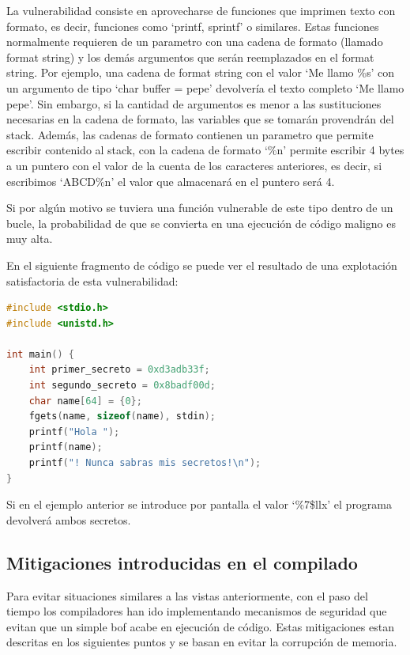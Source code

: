 La vulnerabilidad consiste en aprovecharse de funciones que imprimen texto con formato, es decir, funciones como `printf, sprintf' o similares.
Estas funciones normalmente requieren de un parametro con una cadena de formato (llamado format string) y los demás argumentos que serán reemplazados en el format string.
Por ejemplo, una cadena de format string con el valor `Me llamo \%s' con un argumento de tipo `char \*buffer = pepe' devolvería el texto completo `Me llamo pepe'.
Sin embargo, si la cantidad de argumentos es menor a las sustituciones necesarias en la cadena de formato, las variables que se tomarán provendrán del stack.
Además, las cadenas de formato contienen un parametro que permite escribir contenido al stack, con la cadena de formato `\%n' permite escribir 4 bytes a un puntero con el valor de la cuenta de los caracteres anteriores, es decir, si escribimos `ABCD\%n' el valor que almacenará en el puntero será 4.

Si por algún motivo se tuviera una función vulnerable de este tipo dentro de un bucle, la probabilidad de que se convierta en una ejecución de código maligno es muy alta.

En el siguiente fragmento de código se puede ver el resultado de una explotación satisfactoria de esta vulnerabilidad:
\pagebreak
\begin{lstlisting}[language=C, caption=Vulnerabilidad de tipo Format String]
#include <stdio.h>
#include <unistd.h>

int main() {
    int primer_secreto = 0xd3adb33f;
    int segundo_secreto = 0x8badf00d;
    char name[64] = {0};
    fgets(name, sizeof(name), stdin);
    printf("Hola ");
    printf(name);
    printf("! Nunca sabras mis secretos!\n");
}
\end{lstlisting}

Si en el ejemplo anterior se introduce por pantalla el valor `\%7\$llx' el programa devolverá ambos secretos.

\subsection{Mitigaciones introducidas en el compilado} \label{subsec:mitigaciones}
Para evitar situaciones similares a las vistas anteriormente, con el paso del tiempo los compiladores han ido implementando mecanismos de seguridad que evitan que un simple \acrshort{bof} acabe en ejecución de código.
Estas mitigaciones estan descritas en los siguientes puntos y se basan en evitar la corrupción de memoria.

